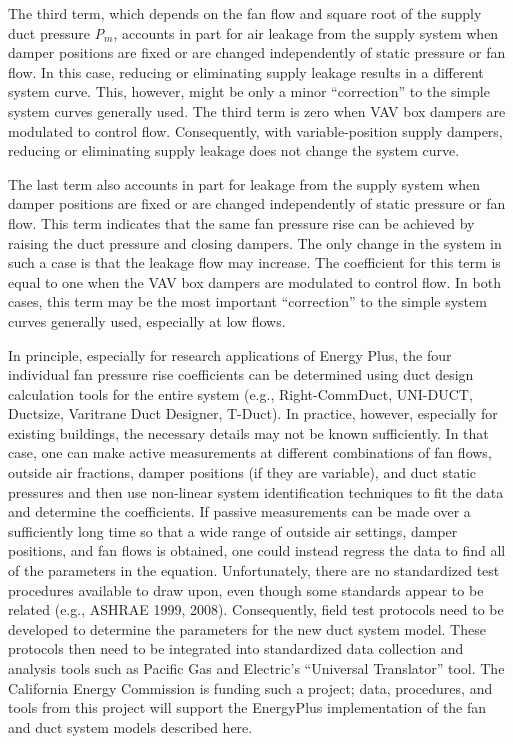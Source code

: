 The third term, which depends on the fan flow and square root of the supply duct pressure \emph{P\(_{m}\)}, accounts in part for air leakage from the supply system when damper positions are fixed or are changed independently of static pressure or fan flow. In this case, reducing or eliminating supply leakage results in a different system curve. This, however, might be only a minor ``correction'' to the simple system curves generally used. The third term is zero when VAV box dampers are modulated to control flow. Consequently, with variable-position supply dampers, reducing or eliminating supply leakage does not change the system curve.

The last term also accounts in part for leakage from the supply system when damper positions are fixed or are changed independently of static pressure or fan flow. This term indicates that the same fan pressure rise can be achieved by raising the duct pressure and closing dampers. The only change in the system in such a case is that the leakage flow may increase. The coefficient for this term is equal to one when the VAV box dampers are modulated to control flow. In both cases, this term may be the most important ``correction'' to the simple system curves generally used, especially at low flows.

In principle, especially for research applications of Energy Plus, the four individual fan pressure rise coefficients can be determined using duct design calculation tools for the entire system (e.g., Right-CommDuct, UNI-DUCT, Ductsize, Varitrane Duct Designer, T-Duct). In practice, however, especially for existing buildings, the necessary details may not be known sufficiently. In that case, one can make active measurements at different combinations of fan flows, outside air fractions, damper positions (if they are variable), and duct static pressures and then use non-linear system identification techniques to fit the data and determine the coefficients. If passive measurements can be made over a sufficiently long time so that a wide range of outside air settings, damper positions, and fan flows is obtained, one could instead regress the data to find all of the parameters in the equation. Unfortunately, there are no standardized test procedures available to draw upon, even though some standards appear to be related (e.g., ASHRAE 1999, 2008). Consequently, field test protocols need to be developed to determine the parameters for the new duct system model. These protocols then need to be integrated into standardized data collection and analysis tools such as Pacific Gas and Electric's ``Universal Translator'' tool. The California Energy Commission is funding such a project; data, procedures, and tools from this project will support the EnergyPlus implementation of the fan and duct system models described here.

